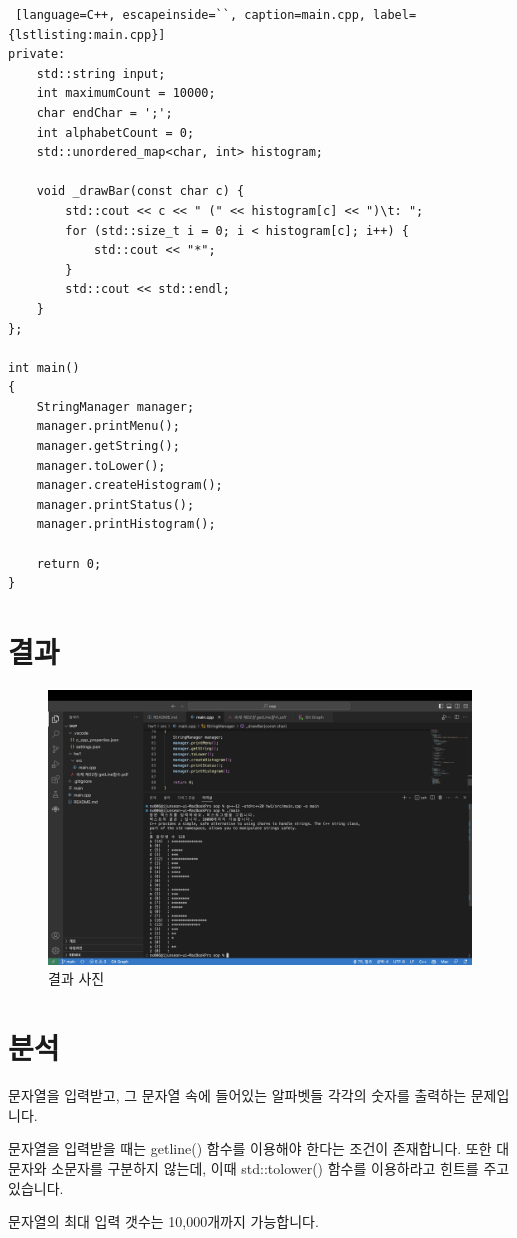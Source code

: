 \documentclass{article}
\begin{document}
\begin{lstlisting} [language=C++, escapeinside=``, caption=main.cpp, label={lstlisting:main.cpp}]
private:
    std::string input;
    int maximumCount = 10000;
    char endChar = ';';
    int alphabetCount = 0;
    std::unordered_map<char, int> histogram;

    void _drawBar(const char c) {
        std::cout << c << " (" << histogram[c] << ")\t: ";
        for (std::size_t i = 0; i < histogram[c]; i++) {
            std::cout << "*";
        }
        std::cout << std::endl;
    }
};

int main()
{
    StringManager manager;
    manager.printMenu();
    manager.getString();
    manager.toLower();
    manager.createHistogram();
    manager.printStatus();
    manager.printHistogram();

    return 0;
}
\end{lstlisting}
\section{결과}
\begin{figure}[ht]
    \centering
    \includegraphics[width=\textwidth]{result.png}
    \caption{결과 사진}
    \label{fig:result}
\end{figure}

\section{분석}
문자열을 입력받고, 그 문자열 속에 들어있는 알파벳들 각각의 숫자를 출력하는 문제입니다.

문자열을 입력받을 때는 getline() 함수를 이용해야 한다는 조건이 존재합니다. 또한 대문자와 소문자를 구분하지 않는데, 이때 std::tolower() 함수를 이용하라고 힌트를 주고 있습니다.

문자열의 최대 입력 갯수는 10,000개까지 가능합니다.
\end{document}
